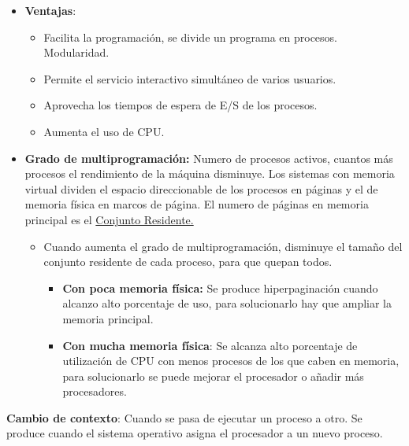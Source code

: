 \documentclass[12pt, twoside, openright]{report} %
\begin{document}
  \begin{itemize}
  \item \textbf{Ventajas}:
    

    \begin{itemize}
    \item Facilita la programación, se divide un programa en procesos.
      Modularidad.
      
    \item Permite el servicio interactivo simultáneo de varios usuarios.
      
    \item Aprovecha los tiempos de espera de E/S de los procesos.
      
    \item Aumenta el uso de CPU.
      
    \end{itemize}
  \item \textbf{Grado de multiprogramación:} Numero de procesos activos,
    cuantos más procesos el rendimiento de la máquina disminuye. Los
    sistemas con memoria virtual dividen el espacio direccionable de los
    procesos en páginas y el de memoria física en marcos de página. El
    numero de páginas en memoria principal es el \underline{Conjunto
    Residente.}
    

    \begin{itemize}
    \item Cuando aumenta el grado de multiprogramación, disminuye el tamaño
      del conjunto residente de cada proceso, para que quepan todos.
      

      \begin{itemize}
      \item \textbf{Con poca memoria física:} Se produce hiperpaginación
        cuando alcanzo alto porcentaje de uso, para solucionarlo hay que
        ampliar la memoria principal.
        
      \item \textbf{Con mucha memoria física}: Se alcanza alto porcentaje de
        utilización de CPU con menos procesos de los que caben en
        memoria, para solucionarlo se puede mejorar el procesador o
        añadir más procesadores.
        
      \end{itemize}
    \end{itemize}
  \end{itemize}
\textbf{Cambio de contexto}: Cuando se pasa de ejecutar un proceso a
  otro. Se produce cuando el sistema operativo asigna el procesador a un
  nuevo proceso.
  
\end{document}
